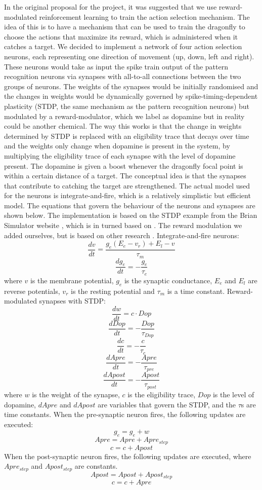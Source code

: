 \documentclass[a4paper,11pt]{article}
\begin{document}
In the original proposal for the project, it was suggested that we use reward-modulated reinforcement learning to train the action selection mechanism. The idea of this is to have a mechanism that can be used to train the dragonfly to choose the actions that maximize its reward, which is administered when it catches a target. 
\newline
\newline
	We decided to implement a network of four action selection neurons, each representing one direction of movement (up, down, left and right). These neurons would take as input the spike train output of the pattern recognition neurons via synapses with all-to-all connections between the two groups of neurons. The weights of the synapses would be initially randomised and the changes in weights would be dynamically governed by spike-timing-dependent plasticity (STDP, the same mechanism as the pattern recognition neurons) but modulated by a reward-modulator, which we label as dopamine but in reality could be another chemical. The way this works is that the change in weights determined by STDP is replaced with an eligibility trace that decays over time and the weights only change when dopamine is present in the system, by multiplying the eligibility trace of each synapse with the level of dopamine present. The dopamine is given a boost whenever the dragonfly focal point is within a certain distance of a target. The conceptual idea is that the synapses that contribute to catching the target are strengthened. The actual model used for the neurons is integrate-and-fire, which is a relatively simplistic but efficient model. The equations that govern the behaviour of the neurons and synapses are shown below. The implementation is based on the STDP example from the Brian Simulator website \cite{brian}, which is in turned based on \cite{Song2000}. The reward modulation we added ourselves, but is based on other research \cite{Izhikevich2007}.
\newline
\newline
Integrate-and-fire neurons:
$$\frac{dv}{dt}=\frac{g _{e} (E_{e}-v _{r}) + E_{l} -v}{ \tau_{m}}$$
$$\frac{dg_{e}}{dt}= -\frac{g_{e}}{\tau_{e}}$$
where $v$ is the membrane potential, $g_{e}$ is the synaptic conductance, $E_{e}$ and $E_{l}$ are reverse potentials, $v_{r}$ is the resting potential and $\tau _{m}$ is a time constant.
\newline
\newline
Reward-modulated synapses with STDP:
$$\frac{dw}{dt} = c \cdot Dop$$
$$\frac{dDop}{dt}=-\frac{Dop}{\tau _{Dop}}$$
$$\frac{dc}{dt} = -\frac{c}{\tau _{c}}$$
$$\frac{dApre}{dt}=-\frac{Apre}{\tau_{pre}}$$
$$\frac{dApost}{dt}=-\frac{Apost}{\tau_{post}}$$
where $w$ is the weight of the synapse, $c$ is the eligibility trace, $Dop$ is the level of dopamine, $dApre$ and $dApost$ are variables that govern the STDP, and the $\tau$s are time constants.
When the pre-synaptic neuron fires, the following updates are executed:
$$g_{e} = g_{e} + w$$
$$Apre = Apre + Apre _{step}$$
$$c =c+Apost$$
When the post-synaptic neuron fires, the following updates are executed, where $Apre_{step}$ and $Apost_{step}$ are constants.
$$Apost = Apost + Apost _{step}$$
$$c =c+Apre$$
\end{document}
